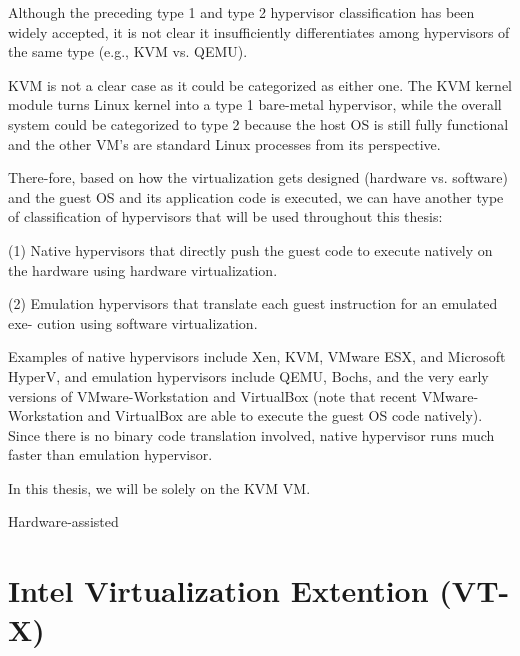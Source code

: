 \documentclass{report}
\begin{document}
\begin{spacing}{1.5}
{\large
Although the preceding type 1 and type 2 hypervisor classification has been widely
accepted, it is not clear it insufficiently differentiates among hypervisors of the same type (e.g., KVM vs. QEMU).


KVM is not a clear case as it could be categorized as either one. The KVM kernel module turns Linux kernel into a type 1 bare-metal hypervisor, while the overall system could be categorized to type 2 because the host OS is still fully functional and the other VM's are standard Linux processes from its perspective.


There-fore, based on how the virtualization gets designed (hardware vs. software) and the guest OS and its 
application code is executed, we can have another type of classification of hypervisors that will be used 
throughout this thesis:
\newline
}

{\large
(1) Native hypervisors that directly push the guest code to execute natively on the
hardware using hardware virtualization.
\newline
}


{\large
(2) Emulation hypervisors that translate each guest instruction for an emulated exe-
cution using software virtualization.
\newline
}

{\large
Examples of native hypervisors include Xen, KVM, VMware ESX, and Microsoft HyperV, and emulation hypervisors include QEMU, Bochs, and the very early versions of
VMware-Workstation and VirtualBox (note that recent VMware-Workstation and VirtualBox are able to execute the guest OS code natively). Since there is no binary code
translation involved, native hypervisor runs much faster than emulation hypervisor.

In this thesis, we will be solely on the KVM VM.








Hardware-assisted




}













\section{Intel Virtualization Extention (VT-X)}


\end{spacing}
\end{document}
